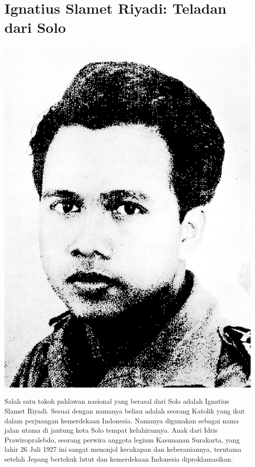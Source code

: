 \newpage
\section*{Ignatius Slamet Riyadi: Teladan dari Solo}
\begin{floatingfigure}[r]{2cm}
\begin{center}
\includegraphics[scale=0.15]{Slamet-riyadi.ps}
\end{center}
\end{floatingfigure}
Salah satu tokoh pahlawan nasional yang berasal dari Solo adalah Ignatius Slamet Riyadi. Sesuai dengan namanya beliau adalah seorang Katolik yang ikut dalam perjuangan kemerdekaan Indonesia. 
Namanya digunakan sebagai nama jalan utama di jantung kota Solo tempat kelahirannya.   
Anak dari Idris Prawiropralebdo, seorang perwira anggota legium Kasunanan Surakarta, yang lahir 26 Juli 1927 ini sangat menonjol kecakapan dan keberaniannya, terutama setelah Jepang bertekuk lutut dan kemerdekaan Indonesia diproklamasikan. 

